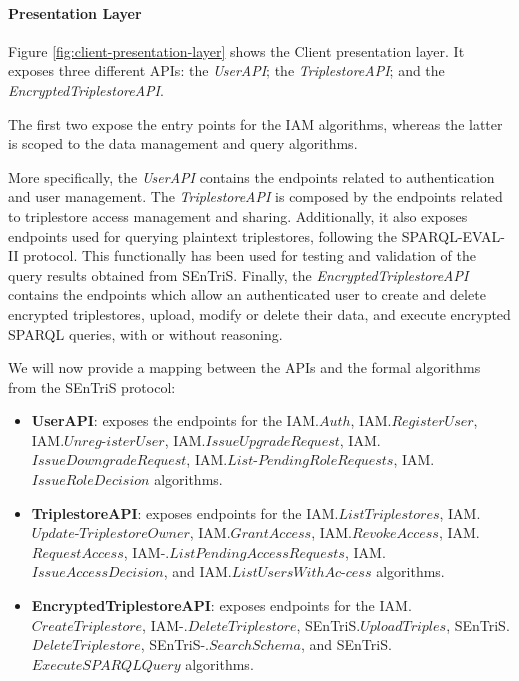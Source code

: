 \paragraph*{Presentation Layer} Figure \ref{fig:client-presentation-layer} shows the Client presentation layer. It exposes three different \gls{API}s: the \emph{UserAPI}; the \emph{TriplestoreAPI}; and the \emph{EncryptedTriplestoreAPI}.


The first two expose the entry points for the \gls{IAM} algorithms, whereas the latter is scoped to the data management and query algorithms.

More specifically, the \emph{UserAPI} contains the endpoints related to authentication and user  management. The \emph{TriplestoreAPI} is composed by the endpoints related to triplestore access management and sharing. Additionally, it also exposes endpoints used for querying plaintext triplestores, following the SPARQL-EVAL-II protocol. This functionally has been used for testing and validation of the query results obtained from \gls{SEnTriS}. Finally, the \emph{EncryptedTriplestoreAPI} contains the endpoints which allow an authenticated user to create and delete encrypted triplestores, upload, modify or delete their data, and execute encrypted \gls{SPARQL} queries, with or without reasoning.

We will now provide a mapping between the \gls{API}s and the formal algorithms from the \gls{SEnTriS} protocol:

\begin{itemize}
    \item \textbf{UserAPI}: exposes the endpoints for the IAM.$Auth$, IAM.$RegisterUser$, IAM.$Unreg$\textrm{-}\linebreak$isterUser$, IAM.$IssueUpgradeRequest$, IAM.$IssueDowngradeRequest$, IAM.$List$\textrm{-}\linebreak$PendingRoleRequests$, IAM.$IssueRoleDecision$ algorithms.
    
    \item \textbf{TriplestoreAPI}: exposes endpoints for the IAM.$ListTriplestores$, IAM.$Update$\textrm{-}\linebreak$TriplestoreOwner$, IAM.$GrantAccess$, IAM.$RevokeAccess$, IAM.$RequestAccess$, IAM\textrm{-}.$ListPendingAccessRequests$, IAM.$IssueAccessDecision$, and IAM.$ListUsersWithAc$\textrm{-}$cess$ algorithms.
    
    \item \textbf{EncryptedTriplestoreAPI}: exposes endpoints for the IAM.$CreateTriplestore$, IAM\textrm{-}\linebreak.$DeleteTriplestore$, SEnTriS.$UploadTriples$, SEnTriS.$DeleteTriplestore$, SEnTriS\textrm{-}\linebreak.$SearchSchema$, and SEnTriS.$ExecuteSPARQLQuery$ algorithms.

\end{itemize}

